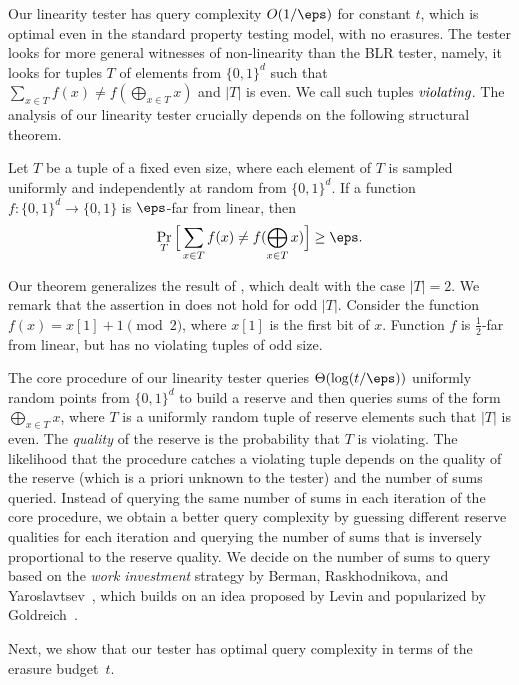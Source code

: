 \documentclass{toc}
\begin{document}
Our linearity tester has query complexity $O(1/\eps)$ for constant $t$, which is optimal even in the standard property testing model, with no erasures. The tester looks for more general witnesses of non-linearity than the BLR tester, namely,  it looks for tuples $T$ of elements from $\{0,1\}^d$ such that $\sum_{x \in T} f(x) \neq f(\bigoplus_{x\in T} x)$ and $|T|$ is even.
%
We call such tuples $\emph{violating}$. The analysis of our linearity tester crucially depends on the following structural theorem.

\begin{theorem}\label{thm:fourier}
Let $T$ be a tuple of a fixed even size, where each element of $T$ is sampled uniformly and independently at random from $\{0,1\}^d$. If a function $f \colon \{0,1\}^d \to \{0,1\}$ is $\eps$-far from linear, then 
\begin{equation*}
    \Pr_T\Big[\sum_{x\in T}f(x) \neq f(\bigoplus_{x\in T} x )\Big] \geq \eps.
\end{equation*}
\end{theorem}

\noindent  Our theorem generalizes the result of \cite{BellareCHKS96}, which dealt with the case $|T|=2$. We remark that the assertion in  does not hold for odd $|T|$. Consider the function $f(x) = x[1] + 1 \pmod 2$, where $x[1]$ is the first bit of $x$. Function $f$ is $\frac 12$-far from linear, but  has no violating tuples of odd size.

The core procedure of our linearity tester queries $\Theta(\log(t/\eps))$ uniformly random points from $\{0,1\}^d$ to build a reserve and then queries sums of the form $\bigoplus_{x \in T} x$, where $T$ is a uniformly random tuple of reserve elements such that $|T|$ is even. The \emph{quality} of the reserve is the probability that $T$ is violating. The  likelihood that the procedure catches a violating tuple depends on the quality of the reserve (which is a priori unknown to the tester) and the number of sums queried. Instead of querying the same number of sums in each iteration of the core procedure, %
we
obtain a better query complexity by guessing different reserve qualities for each iteration and querying the number of sums that is inversely proportional to the reserve quality. We decide on the number of sums to query based on the {\em work investment} strategy by Berman, Raskhodnikova, and Yaroslavtsev~\cite{BermanRY14}, which builds on an idea proposed by Levin and popularized by Goldreich~\cite{Goldreich14}.   


Next, we show that our tester has optimal query complexity in terms of the erasure budget~$t$. 
\end{document}
